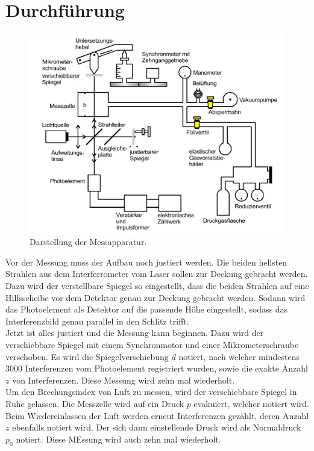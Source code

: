 \section{Durchführung}
\label{sec:Durchführung}

\begin{figure}
    \centering
    \includegraphics[width=12cm]{data/abb4.png}
    \caption{Darstellung der Messapparatur.}
    \label{fig:abb4}
\end{figure}
\FloatBarrier

Vor der Messung muss der Aufbau noch justiert werden.
Die beiden hellsten Strahlen aus dem Interferrometer vom Laser sollen zur Deckung gebracht werden.
Dazu wird der verstellbare Spiegel so eingestellt, dass die beiden Strahlen auf eine Hilfsscheibe vor dem Detektor genau zur Deckung gebracht werden.
Sodann wird das Photoelement als Detektor auf die passende Höhe eingestellt, sodass das Interferenzbild genau parallel in den Schlitz trifft.
\\
Jetzt ist alles justiert und die Messung kann beginnen.
Dazu wird der verschiebbare Spiegel mit einem Synchronmotor und einer Mikrometerschraube verschoben.
Es wird die Spiegelverschiebung $d$ notiert, nach welcher mindestens 3000 Interferenzen vom Photoelement registriert wurden, sowie die exakte Anzahl $z$ von Interferenzen.
Diese Messung wird zehn mal wiederholt.
\\
Um den Brechungsindex von Luft zu messen, wird der verschiebbare Spiegel in Ruhe gelassen. 
Die Messzelle wird auf ein Druck $p$ evakuiert, welcher notiert wird.
Beim Wiedereinlassen der Luft werden erneut Interferenzen gezählt, deren Anzahl $z$ ebenfalls notiert wird.
Der sich dann einstellende Druck wird als Normaldruck $p_0$ notiert.
Diese MEssung wird auch zehn mal wiederholt.